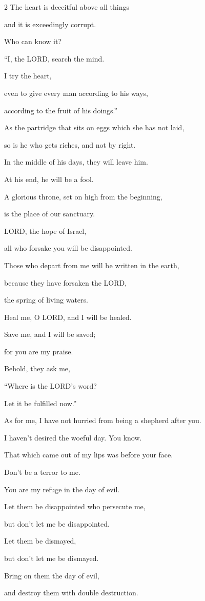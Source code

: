 \begin{multicols}{2}
\myverse{}The heart is deceitful above all things

and it is exceedingly corrupt.

Who can know it?

\vspace{\baselineskip}

\myverse{}“I, the LORD, search the mind.

I try the heart,

even to give every man according to his ways,

according to the fruit of his doings.”

\vspace{\baselineskip}

\myverse{}As the partridge that sits on eggs which she has not laid,

so is he who gets riches, and not by right.

In the middle of his days, they will leave him.

At his end, he will be a fool.


\myverse{}A glorious throne, set on high from the beginning,

is the place of our sanctuary.


\myverse{}LORD, the hope of Israel,

all who forsake you will be disappointed.

Those who depart from me will be written in the earth,

because they have forsaken the LORD,

the spring of living waters.


\myverse{}Heal me, O LORD, and I will be healed.

Save me, and I will be saved;

for you are my praise.


\myverse{}Behold, they ask me,

“Where is the LORD’s word?

Let it be fulfilled now.”


\myverse{}As for me, I have not hurried from being a shepherd after you.

I haven’t desired the woeful day. You know.

That which came out of my lips was before your face.


\myverse{}Don’t be a terror to me.

You are my refuge in the day of evil.


\myverse{}Let them be disappointed who persecute me,

but don’t let me be disappointed.

Let them be dismayed,

but don’t let me be dismayed.

Bring on them the day of evil,

and destroy them with double destruction.

\end{multicols}

